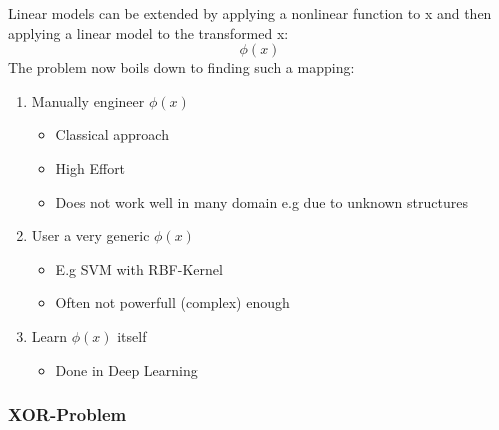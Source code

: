 \documentclass[../Main.tex]{subfiles}
\begin{document}
Linear models can be extended by 
applying a nonlinear function to x 
and then applying a linear model to 
the transformed x:
\begin{equation}
    \phi(x)
\end{equation}
The problem now boils down to finding such a mapping:
\begin{enumerate}
    \item Manually engineer \(\phi(x)\)
        \begin{itemize}
            \item Classical approach
            \item High Effort
            \item Does not work well in many domain e.g due to unknown structures
        \end{itemize}
    \item User a very generic \(\phi(x)\)
        \begin{itemize}
            \item E.g SVM with RBF-Kernel
            \item Often not powerfull (complex) enough
        \end{itemize}
    \item Learn \(\phi(x)\) itself
        \begin{itemize}
            \item Done in Deep Learning
        \end{itemize}
\end{enumerate}

\subsubsection{XOR-Problem}
\end{document}
